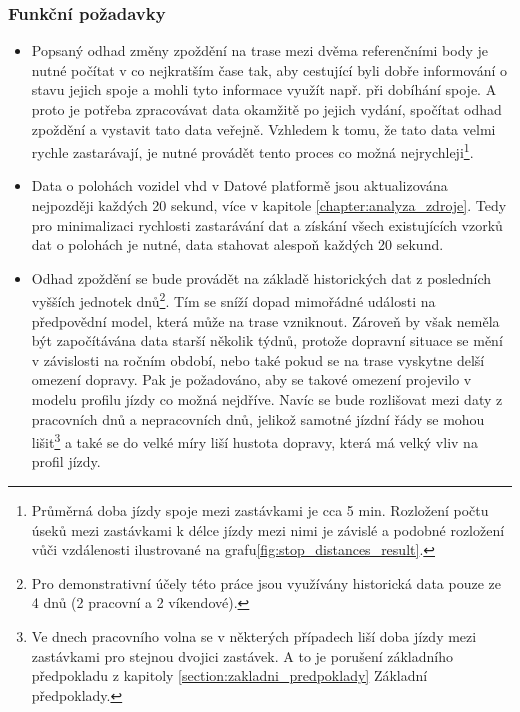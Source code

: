 \subsubsection{Funkční požadavky}


\begin{itemize}
\item
Popsaný odhad změny zpoždění na trase mezi dvěma referenčními body je nutné počítat v co nejkratším čase tak, aby cestující byli dobře informování o stavu jejich spoje a mohli tyto informace využít např. při dobíhání spoje. A proto je potřeba zpracovávat data okamžitě po jejich vydání, spočítat odhad zpoždění a vystavit tato data veřejně. Vzhledem k tomu, že tato data velmi rychle zastarávají, je nutné provádět tento proces co možná nejrychleji\footnote{Průměrná doba jízdy spoje mezi zastávkami je cca 5 min. Rozložení počtu úseků mezi zastávkami k délce jízdy mezi nimi je závislé a podobné rozložení vůči vzdálenosti ilustrované na grafu\ref{fig:stop_distances_result}.}.


\item


Data o polohách vozidel \gls{vhd} v Datové platformě jsou aktualizována nejpozději každých 20 sekund, více v kapitole \ref{chapter:analyza_zdroje}. Tedy pro minimalizaci rychlosti zastarávání dat a získání všech existujících vzorků dat o polohách je nutné, data stahovat alespoň každých 20 sekund.


\item


Odhad zpoždění se bude provádět na základě historických dat z posledních vyšších jednotek dnů\footnote{Pro demonstrativní účely této práce jsou využívány historická data pouze ze 4 dnů (2 pracovní a 2 víkendové).}. Tím se sníží dopad mimořádné události na předpovědní model, která může na trase vzniknout. Zároveň by však neměla být započítávána data starší několik týdnů, protože dopravní situace se mění v závislosti na ročním období, nebo také pokud se na trase vyskytne delší omezení dopravy. Pak je požadováno, aby se takové omezení projevilo v modelu profilu jízdy co možná nejdříve. Navíc se bude rozlišovat mezi daty z pracovních dnů a nepracovních dnů, jelikož samotné jízdní řády se mohou lišit\footnote{Ve dnech pracovního volna se v některých případech liší doba jízdy mezi zastávkami pro stejnou dvojici zastávek. A to je porušení základního předpokladu z kapitoly \ref{section:zakladni_predpoklady} Základní předpoklady.} a také se do velké míry liší hustota dopravy, která má velký vliv na profil jízdy.



\end{itemize}
